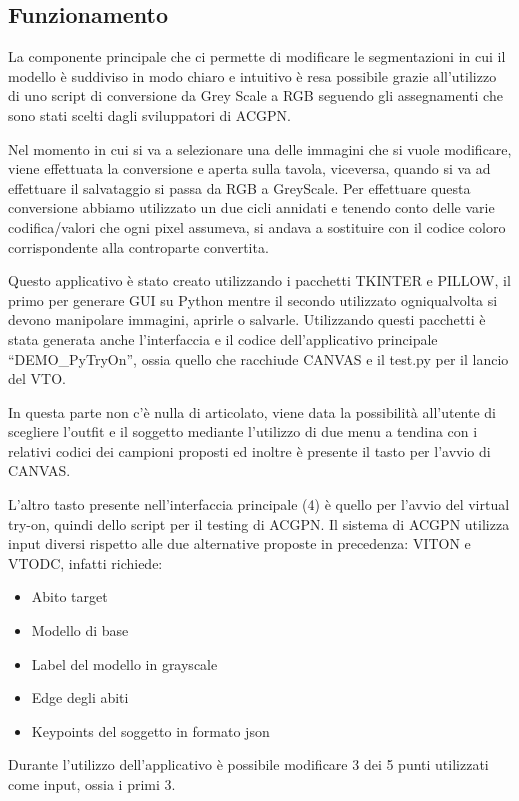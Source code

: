 \documentclass[final, 11pt]{article}
\begin{document}
	\subsection{Funzionamento}
	La componente principale che ci permette di modificare le segmentazioni in cui il modello è suddiviso in modo chiaro e intuitivo è resa possibile grazie all’utilizzo di uno script di conversione da Grey Scale a RGB seguendo gli assegnamenti che sono stati scelti dagli sviluppatori di ACGPN. 
	
	Nel momento in cui si va a selezionare una delle immagini che si vuole modificare, viene effettuata la conversione e aperta sulla tavola, viceversa, quando si va ad effettuare il salvataggio si passa da RGB a GreyScale. Per effettuare questa conversione abbiamo utilizzato un due cicli annidati e tenendo conto delle varie codifica/valori che ogni pixel assumeva, si andava a sostituire con il codice coloro corrispondente alla controparte convertita.
	
	Questo applicativo è stato creato utilizzando i pacchetti TKINTER e PILLOW, il primo per generare GUI su Python mentre il secondo utilizzato ogniqualvolta si devono manipolare immagini, aprirle o salvarle.
	Utilizzando questi pacchetti è stata generata anche l’interfaccia e il codice dell’applicativo principale “DEMO\_PyTryOn”, ossia quello che racchiude CANVAS e il test.py per il lancio del VTO.
	
	In questa parte non c’è nulla di articolato, viene data la possibilità all’utente di scegliere l’outfit e il soggetto mediante l’utilizzo di due menu a tendina con i relativi codici dei campioni proposti ed inoltre è presente il tasto per l’avvio di CANVAS.
	
	L’altro tasto presente nell’interfaccia principale (4) è quello per l’avvio del virtual try-on, quindi dello script per il testing di ACGPN.
	Il sistema di ACGPN utilizza input diversi rispetto alle due alternative proposte in precedenza: VITON e VTODC, infatti richiede:
	\begin{itemize}
		\item Abito target
		\item Modello di base
		\item Label del modello in grayscale
		\item Edge degli abiti
		\item Keypoints del soggetto in formato json
	\end{itemize}
	Durante l’utilizzo dell’applicativo è possibile modificare 3 dei 5 punti utilizzati come input, ossia i primi 3.
	
\end{document}
